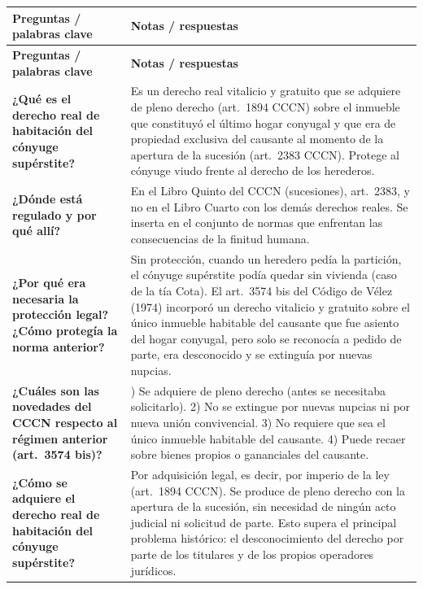 \documentclass[12pt,oneside]{book}
\begin{document}
\begin{longtable}{
    >{\raggedright\arraybackslash}p{}
    >{\raggedright\arraybackslash}p{}
}
\toprule
\textbf{Preguntas / palabras clave} & \textbf{Notas / respuestas} \\
\midrule
\endfirsthead
\toprule
\textbf{Preguntas / palabras clave} & \textbf{Notas / respuestas} \\
\midrule
\endhead
\bottomrule
\endfoot

\textbf{¿Qué es el derecho real de habitación del cónyuge supérstite?} &
Es un derecho real vitalicio y gratuito que se adquiere de pleno derecho (art.~1894 CCCN) sobre el inmueble que constituyó el último hogar conyugal y que era de propiedad exclusiva del causante al momento de la apertura de la sucesión (art.~2383 CCCN). Protege al cónyuge viudo frente al derecho de los herederos. \\[0.8em]

\textbf{¿Dónde está regulado y por qué allí?} &
En el Libro Quinto del CCCN (sucesiones), art.~2383, y no en el Libro Cuarto con los demás derechos reales. Se inserta en el conjunto de normas que enfrentan las consecuencias de la finitud humana. \\[0.8em]

\textbf{¿Por qué era necesaria la protección legal? ¿Cómo protegía la norma anterior?} &
Sin protección, cuando un heredero pedía la partición, el cónyuge supérstite podía quedar sin vivienda (caso de la tía Cota). El art.~3574 bis del Código de Vélez (1974) incorporó un derecho vitalicio y gratuito sobre el único inmueble habitable del causante que fue asiento del hogar conyugal, pero solo se reconocía a pedido de parte, era desconocido y se extinguía por nuevas nupcias. \\[0.8em]

\textbf{¿Cuáles son las novedades del CCCN respecto al régimen anterior (art.~3574 bis)?} &
1) Se adquiere de pleno derecho (antes se necesitaba solicitarlo). 2) No se extingue por nuevas nupcias ni por nueva unión convivencial. 3) No requiere que sea el único inmueble habitable del causante. 4) Puede recaer sobre bienes propios o gananciales del causante. \\[0.8em]

\textbf{¿Cómo se adquiere el derecho real de habitación del cónyuge supérstite?} &
Por adquisición legal, es decir, por imperio de la ley (art.~1894 CCCN). Se produce de pleno derecho con la apertura de la sucesión, sin necesidad de ningún acto judicial ni solicitud de parte. Esto supera el principal problema histórico: el desconocimiento del derecho por parte de los titulares y de los propios operadores jurídicos. \\[0.8em]


\end{longtable}
\end{document}
